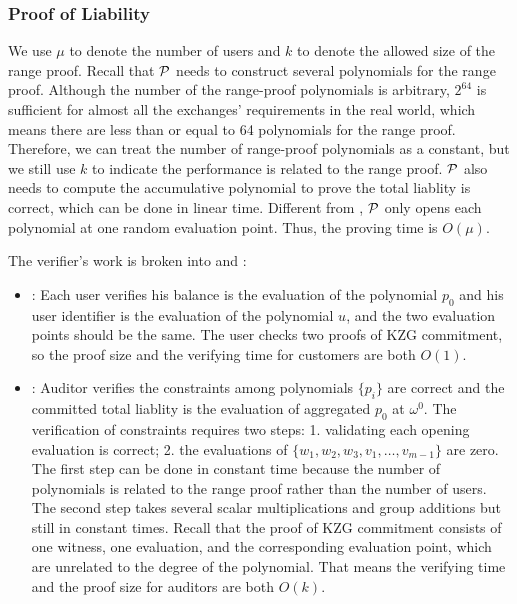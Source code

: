 \subsubsection{Proof of Liability}
We use $\mu$ to denote the number of users and $k$ to denote the allowed size of the range proof. Recall that $\mathcal{P}$ needs to construct several polynomials for the range proof. Although the number of the range-proof polynomials is arbitrary, $2^{64}$ is sufficient for almost all the exchanges' requirements in the real world, which means there are less than or equal to 64 polynomials for the range proof. Therefore, we can treat the number of range-proof polynomials as a constant, but we still use $k$ to indicate the performance is related to the range proof. $\mathcal{P}$ also needs to compute the accumulative polynomial to prove the total liablity is correct, which can be done in linear time. Different from \bootstrap, $\mathcal{P}$ only opens each polynomial at one random evaluation point. Thus, the proving time is $O(\mu)$.

The verifier's work is broken into \userproof and \pol:
\begin{itemize}

\item \userproof: Each user verifies his balance is the evaluation of the polynomial $p_0$ and his user identifier is the evaluation of the polynomial $u$, and the two evaluation points should be the same. The user checks two proofs of KZG commitment, so the proof size and the verifying time for customers are both $O(1)$.

\item \pol: Auditor verifies the constraints among polynomials $\{p_i\}$ are correct and the committed total liablity is the evaluation of aggregated $p_0$ at $\omega^0$. The verification of constraints requires two steps: 1. validating each opening evaluation is correct; 2. the evaluations of $\{w_1,w_2,w_3,v_1,\dots,v_{m-1}\}$ are zero. The first step can be done in constant time because the number of polynomials is related to the range proof rather than the number of users. The second step takes several scalar multiplications and group additions but still in constant times. Recall that the proof of KZG commitment consists of one witness, one evaluation, and the corresponding evaluation point, which are unrelated to the degree of the polynomial. That means the verifying time and the proof size for auditors are both $O(k)$.

\end{itemize}

